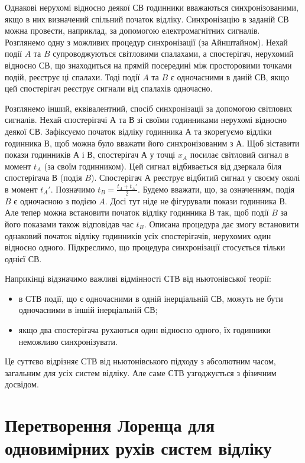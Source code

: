 Однакові нерухомі відносно деякої СВ годинники вважаються синхронізованими, якщо в них визначений спільний початок відліку. Синхронізацію в заданій СВ можна провести, наприклад, за допомогою електромагнітних сигналів. Розглянемо одну з можливих процедур синхронізації (за Айнштайном). Нехай події $A$ та $B$ супроводжуються світловими спалахами, а спостерігач, нерухомий відносно СВ, що знаходиться на прямій посередині між просторовими точками подій, реєструє ці спалахи. Тоді події $A$ та $B$ є одночасними в даній СВ, якщо цей спостерігач реєструє сигнали від спалахів одночасно.

Розглянемо інший, еквівалентний, спосіб синхронізації за допомогою світлових сигналів. Нехай спостерігачі А та В зі своїми годинниками нерухомі відносно деякої СВ. Зафіксуємо початок відліку годинника А та зкорегуємо відліки годинника В, щоб можна було вважати його синхронізованим з А. Щоб зіставити покази годинників А і В, спостерігач А у точці $x_A$ посилає світловий сигнал в момент $t_A$ (за своїм годинником). Цей сигнал відбивається від дзеркала біля спостерігача В (подія $B$). Спостерігач А реєструє відбитий сигнал у своєму околі в момент $t_A'$. Позначимо $t_B = \frac{t_A + t_A'}{2}$. Будемо вважати, що, за означенням, подія $B$ є одночасною з подією $A$. Досі тут ніде не фігурували покази годинника В. Але тепер можна встановити початок відліку годинника В так, щоб події $B$ за його показами також відповідав час $t_B$. Описана процедура дає змогу встановити однаковий початок відліку годинників усіх спостерігачів, нерухомих один відносно одного. Підкреслимо, що процедура синхронізації стосується тільки однієї СВ.

Наприкінці відзначимо важливі відмінності СТВ від ньютонівської теорії:
\begin{itemize}
\item[(i)] в СТВ події, що є одночасними в одній інерціальній СВ, можуть не бути одночасними в іншій інерціальній СВ;
\item[(ii)] якщо два спостерігача рухаються один відносно одного, їх годинники неможливо синхронізувати.
\end{itemize}
Це суттєво відрізняє СТВ від ньютонівського підходу з абсолютним часом, загальним для усіх систем відліку. Але саме СТВ узгоджується з фізичним досвідом.

\section{Перетворення Лоренца для одновимірних рухів систем відліку}

